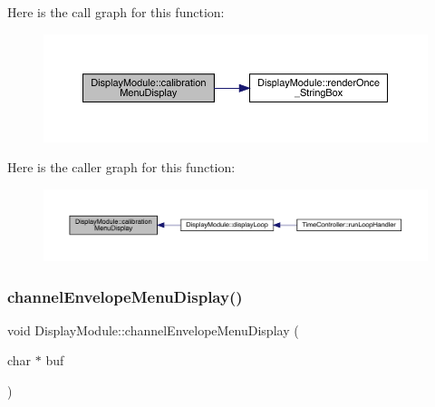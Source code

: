 Here is the call graph for this function\+:
\nopagebreak
\begin{figure}[H]
\begin{center}
\leavevmode
\includegraphics[width=350pt]{class_display_module_ae68c2f34985c276b559df3d7f4fafbbd_cgraph}
\end{center}
\end{figure}
Here is the caller graph for this function\+:
\nopagebreak
\begin{figure}[H]
\begin{center}
\leavevmode
\includegraphics[width=350pt]{class_display_module_ae68c2f34985c276b559df3d7f4fafbbd_icgraph}
\end{center}
\end{figure}
\mbox{\label{class_display_module_a61256f4c2a099fd0b0c59a5bba277914}} 
\subsubsection{\texorpdfstring{channel\+Envelope\+Menu\+Display()}{channelEnvelopeMenuDisplay()}}
{\footnotesize\ttfamily void Display\+Module\+::channel\+Envelope\+Menu\+Display (\begin{DoxyParamCaption}\item[{char $\ast$}]{buf }\end{DoxyParamCaption})}

